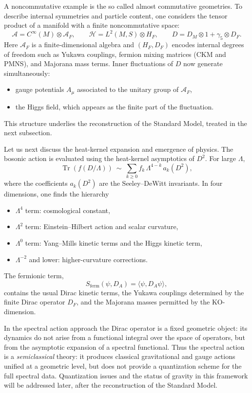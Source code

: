 \documentclass[11pt]{article}
\theoremstyle{plain}
\begin{document}
\medskip

A noncommutative example is the so called almost commutative geometries.  
To describe internal symmetries and particle content, one considers the
tensor product of a manifold with a finite noncommutative space:
\[
\mathcal{A}=C^{\infty}(M)\otimes\mathcal{A}_{F},\qquad  
\mathcal{H}=L^{2}(M,S)\otimes H_{F},\qquad
D=D_{M}\otimes1+\gamma_{5}\otimes D_{F}.
\]
Here $\mathcal{A}_{F}$ is a finite-dimensional algebra and
$(H_{F},D_{F})$
encodes internal degrees of freedom such as Yukawa couplings,
fermion mixing matrices (CKM and PMNS), and Majorana mass terms.
Inner fluctuations of $D$ now generate simultaneously:
\begin{itemize}
\item gauge potentials $A_{\mu}$ associated to the unitary group of $\mathcal{A}_{F}$,
\item the Higgs field, which appears as the finite part of the fluctuation.
\end{itemize}
This structure underlies the reconstruction of the Standard Model, treated in
the next subsection.

\medskip

Let us next discuss the heat-kernel expansion and emergence of physics. 
The bosonic action is evaluated using the heat-kernel asymptotics of $D^{2}$.
For large $\Lambda$,
\[
\operatorname{Tr}(f(D/\Lambda))
~\sim~
\sum_{k\ge 0} f_{k}\,\Lambda^{4-k}\,a_{k}(D^{2}),
\]
where the coefficients $a_{k}(D^{2})$ are the Seeley--DeWitt invariants.
In four dimensions, one finds the hierarchy
\begin{itemize}
\item $\Lambda^{4}$ term: cosmological constant,
\item $\Lambda^{2}$ term: Einstein--Hilbert action and scalar curvature,
\item $\Lambda^{0}$ term: Yang--Mills kinetic terms and the Higgs kinetic term,
\item $\Lambda^{-2}$ and lower: higher-curvature corrections.
\end{itemize}

The fermionic term,
\[
S_{\mathrm{ferm}}(\psi,D_{A})
= \langle \psi, D_{A}\psi\rangle,
\]
contains the usual Dirac kinetic terms, the Yukawa couplings determined by the
finite Dirac operator $D_{F}$, and the Majorana masses  permitted by the
KO-dimension.

\medskip


In the spectral action approach the Dirac operator is a fixed geometric object:
its dynamics do not arise from a functional integral over the space of
operators, but from the asymptotic expansion of a spectral functional.
Thus the spectral action is a \emph{semiclassical} theory: it produces
classical gravitational and gauge actions unified at a geometric level, but
does not provide a quantization scheme for the full spectral data.
Quantization issues and the status of gravity in this framework will be
addressed later, after the reconstruction of the Standard Model.
\end{document}
